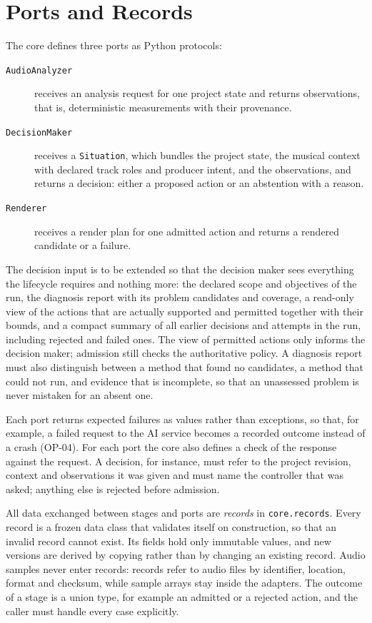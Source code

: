 \section{Ports and Records}
\label{sec:arch-ports}

The core defines three ports as Python protocols:

\begin{description}
	\item[\texttt{AudioAnalyzer}] receives an analysis request for one project state and returns observations, that is, deterministic measurements with their provenance.
	\item[\texttt{DecisionMaker}] receives a \texttt{Situation}, which bundles the project state, the musical context with declared track roles and producer intent, and the observations, and returns a decision: either a proposed action or an abstention with a reason.
	\item[\texttt{Renderer}] receives a render plan for one admitted action and returns a rendered candidate or a failure.
\end{description}

The decision input is to be extended so that the decision maker sees everything the lifecycle requires and nothing more: the declared scope and objectives of the run, the diagnosis report with its problem candidates and coverage, a read-only view of the actions that are actually supported and permitted together with their bounds, and a compact summary of all earlier decisions and attempts in the run, including rejected and failed ones. The view of permitted actions only informs the decision maker; admission still checks the authoritative policy. A diagnosis report must also distinguish between a method that found no candidates, a method that could not run, and evidence that is incomplete, so that an unassessed problem is never mistaken for an absent one. 

Each port returns expected failures as values rather than exceptions, so that, for example, a failed request to the \ac{AI} service becomes a recorded outcome instead of a crash (OP-04). For each port the core also defines a check of the response against the request. A decision, for instance, must refer to the project revision, context and observations it was given and must name the controller that was asked; anything else is rejected before admission.

All data exchanged between stages and ports are \emph{records} in \texttt{core.records}. Every record is a frozen data class that validates itself on construction, so that an invalid record cannot exist. Its fields hold only immutable values, and new versions are derived by copying rather than by changing an existing record. Audio samples never enter records: records refer to audio files by identifier, location, format and checksum, while sample arrays stay inside the adapters. The outcome of a stage is a union type, for example an admitted or a rejected action, and the caller must handle every case explicitly.

